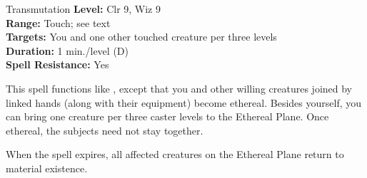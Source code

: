 {Transmutation}
{
	\textbf{Level:}
	Clr 9, Wiz 9\\
	\textbf{Range:}
	Touch; see text\\
	\textbf{Targets:}
	You and one other touched creature per three levels\\
	\textbf{Duration:}
	1 min./level (D)\\
	\textbf{Spell Resistance:}
	Yes\\
}
{
	This spell functions like , except that you and other willing creatures joined by linked hands (along with their equipment) become ethereal. Besides yourself, you can bring one creature per three caster levels to the Ethereal Plane. Once ethereal, the subjects need not stay together.

	When the spell expires, all affected creatures on the Ethereal Plane return to material existence.

}
